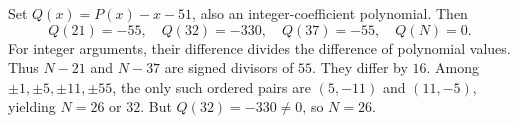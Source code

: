 Set $Q(x)=P(x)-x-51$, also an integer-coefficient polynomial. Then
\[
Q(21)=-55,\quad Q(32)=-330,\quad Q(37)=-55,\quad Q(N)=0.
\]
For integer arguments, their difference divides the difference of polynomial values. Thus $N-21$ and $N-37$ are signed divisors of $55$. They differ by $16$. Among $\pm1,\pm5,\pm11,\pm55$, the only such ordered pairs are $(5,-11)$ and $(11,-5)$, yielding $N=26$ or $32$. But $Q(32)=-330\ne0$, so $\boxed{N=26}$.
